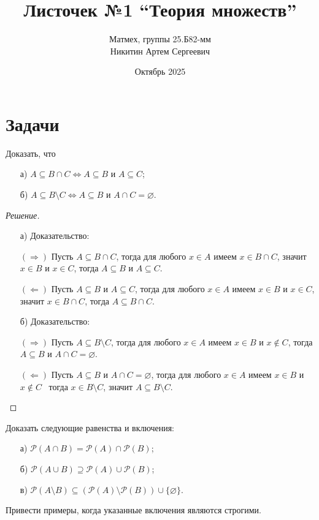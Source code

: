 \documentclass{article}
\title{Листочек №1 ``Теория множеств''}
\author{Матмех, группы 25.Б82-мм \\ Никитин Артем Сергеевич}
\date{Октябрь 2025}
\begin{document}
\maketitle

\section{Задачи}

\begin{task}[1]
Доказать, что
\begin{enumerate}
    \item[а)] $A \subseteq B \cap C \iff A \subseteq B$ и $A \subseteq C$;
    \item[б)] $A \subseteq B \setminus C \iff A \subseteq B$ и $A \cap C = \varnothing$.
\end{enumerate}
\end{task}

\begin{proof}[Решение]\
\begin{enumerate}
    \item[а)] Доказательство:
    
    $(\Rightarrow)$ Пусть $A \subseteq B \cap C$, тогда для любого $x \in A$ имеем $x \in B \cap C$, значит $x \in B$ и $x \in C$, тогда $A \subseteq B$ и $A \subseteq C$.
    
    $(\Leftarrow)$ Пусть $A \subseteq B$ и $A \subseteq C$, тогда для любого $x \in A$ имеем $x \in B$ и $x \in C$, значит $x \in B \cap C$, тогда $A \subseteq B \cap C$.
    
    \item[б)] Доказательство:
    
    $(\Rightarrow)$ Пусть $A \subseteq B \setminus C$, тогда для любого $x \in A$ имеем $x \in B$ и $x \notin C$, тогда $A \subseteq B$ и $A \cap C = \varnothing$.
    
    $(\Leftarrow)$ Пусть $A \subseteq B$ и $A \cap C = \varnothing$, тогда для любого $x \in A$ имеем $x \in B$ и $x \notin C$ \, тогда $x \in B \setminus C$, значит $A \subseteq B \setminus C$.
\end{enumerate}
\end{proof}

\begin{task}[2]
Доказать следующие равенства и включения:
\begin{enumerate}
    \item[а)] $\mathcal{P}(A \cap B) = \mathcal{P}(A) \cap \mathcal{P}(B)$;
    \item[б)] $\mathcal{P}(A \cup B) \supseteq \mathcal{P}(A) \cup \mathcal{P}(B)$;
    \item[в)] $\mathcal{P}(A \setminus B) \subseteq (\mathcal{P}(A) \setminus \mathcal{P}(B)) \cup \{\varnothing\}$.
\end{enumerate}
Привести примеры, когда указанные включения являются строгими.
\end{task}
\end{document}
